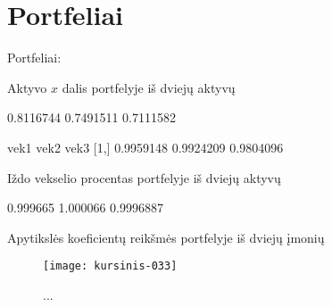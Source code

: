 \documentclass[12pt, a14paper, lithuanian]{article}
\begin{document}
\begin{Schunk}
\end{Schunk}

\section{Portfeliai}
Portfeliai:


\label{C1}
 Aktyvo $x$ dalis portfelyje iš dviejų aktyvų

\begin{Schunk}
\begin{Soutput}
          [,1]      [,2]      [,3]
[1,] 0.8116744 0.7491511 0.7111582
\end{Soutput}
\end{Schunk}

\begin{Schunk}
\begin{Soutput}
          vek1      vek2      vek3
[1,] 0.9959148 0.9924209 0.9804096
\end{Soutput}
\end{Schunk}

 Iždo vekselio procentas portfelyje iš dviejų aktyvų 

\begin{Schunk}
\begin{Soutput}
         [,1]     [,2]      [,3]
[1,] 0.999665 1.000066 0.9996887
\end{Soutput}
\end{Schunk}

 Apytikslės koeficientų reikšmės portfelyje iš dviejų įmonių



\begin{figure}[H]
  \centering
\texttt{[image: kursinis-033]}
  \caption{...}
  
\end{figure}
\end{document}
